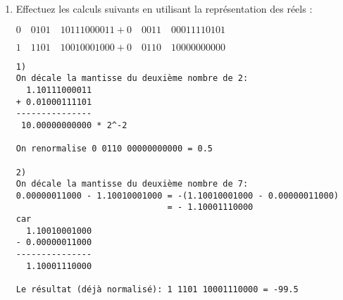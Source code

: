 \documentclass[a4paper,10pt]{exam}
\begin{document}
\begin{enumerate}

\item Effectuez les calculs suivants en utilisant la repr\'esentation des r\'eels :

$0\quad  0101\quad  10111000011 + 0\quad  0011\quad  00011110101$

$1\quad  1101\quad  10010001000 + 0\quad  0110\quad  10000000000$

\begin{solution}
\begin{verbatim}
1)
On décale la mantisse du deuxième nombre de 2:
  1.10111000011
+ 0.01000111101
---------------
 10.00000000000 * 2^-2

On renormalise 0 0110 00000000000 = 0.5

2)
On décale la mantisse du deuxième nombre de 7:
0.00000011000 - 1.10010001000 = -(1.10010001000 - 0.00000011000)
                              = - 1.10001110000
car
  1.10010001000
- 0.00000011000
---------------
  1.10001110000

Le résultat (déjà normalisé): 1 1101 10001110000 = -99.5
\end{verbatim}
\end{solution}
\end{enumerate}
\end{document}
